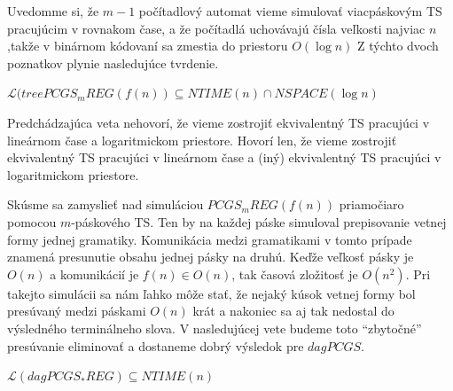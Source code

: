 \medskip

Uvedomme si, že $m-1$ počítadlový automat vieme simulovať
viacpáskovým TS pracujúcim v rovnakom čase, a že počítadlá
uchovávajú čísla veľkosti najviac $n$,takže v binárnom kódovaní sa
zmestia do priestoru $O(\log n)$ Z týchto dvoch poznatkov plynie
nasledujúce tvrdenie.

\begin{veta}
$\mathcal{L}(treePCGS_mREG(f(n))\subseteq NTIME(n)\cap NSPACE(\log
n)$
\end{veta}

\begin{poznamka}
Predchádzajúca veta nehovorí, že vieme zostrojiť ekvivalentný TS
pracujúci v lineárnom čase a logaritmickom priestore. Hovorí len,
že vieme zostrojiť ekvivalentný TS pracujúci v lineárnom čase a
(iný) ekvivalentný TS pracujúci v logaritmickom priestore.
\end{poznamka}

Skúsme sa zamyslieť nad simuláciou $PCGS_mREG(f(n))$ priamočiaro
pomocou $m$-páskového TS. Ten by na každej páske simuloval
prepisovanie vetnej formy jednej gramatiky. Komunikácia medzi
gramatikami v tomto prípade znamená presunutie obsahu jednej pásky
na druhú. Keďže veľkosť pásky je $O(n)$ a komunikácií je $f(n)\in
O(n)$, tak časová zložitosť je $O(n^2)$. Pri takejto simulácii sa
nám ľahko môže stať, že nejaký kúsok vetnej formy bol presúvaný
medzi páskami $O(n)$ krát a nakoniec sa aj tak nedostal do
výsledného terminálneho slova. V nasledujúcej vete budeme toto
``zbytočné'' presúvanie eliminovať a dostaneme dobrý výsledok pre
$dagPCGS$.

\begin{veta}
$\mathcal{L}(dagPCGS_*REG)\subseteq NTIME(n)$
\end{veta}


